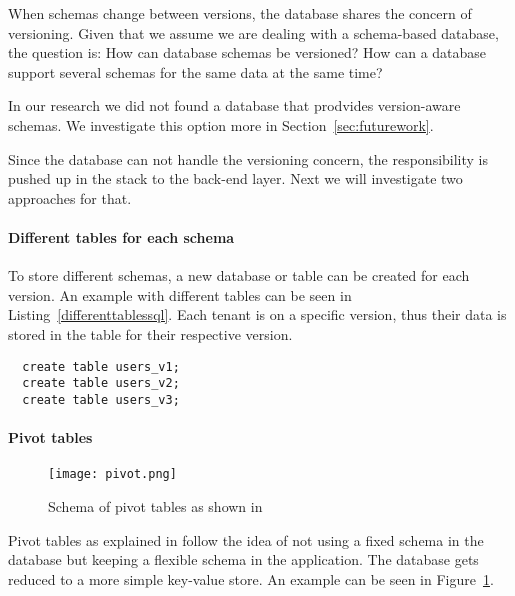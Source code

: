 When schemas change between versions, the database shares the concern of versioning. Given that we assume we are dealing with a schema-based database, the question is: How can database schemas be versioned? How can a database support several schemas for the same data at the same time?

In our research we did not found a database that prodvides version-aware schemas. We investigate this option more in Section~\ref{sec:futurework}.


Since the database can not handle the versioning concern, the responsibility is pushed up in the stack to the back-end layer. Next we will investigate two approaches for that.

\paragraph{Different tables for each schema}

To store different schemas, a new database or table can be created for each version. An example with different tables can be seen in Listing~\ref{differenttablessql}. Each tenant is on a specific version, thus their data is stored in the table for their respective version.

\lstset{language=SQL, caption=sql, label=differenttablessql}
\begin{lstlisting}
  create table users_v1;
  create table users_v2;
  create table users_v3;
\end{lstlisting}

%

\paragraph{Pivot tables}

\begin{figure}
\centering
\texttt{[image: pivot.png]}
\caption{Schema of pivot tables as shown in \cite{Yaish2011}}
\label{fig:pivot}
\end{figure}

Pivot tables as explained in \cite{Yaish2011} \cite{Aulbach2011} \cite{Weissman2009} follow the idea of not using a fixed schema in the database but keeping a flexible schema in the application. The database gets reduced to a more simple key-value store. An example can be seen in Figure~\ref{fig:pivot}.

